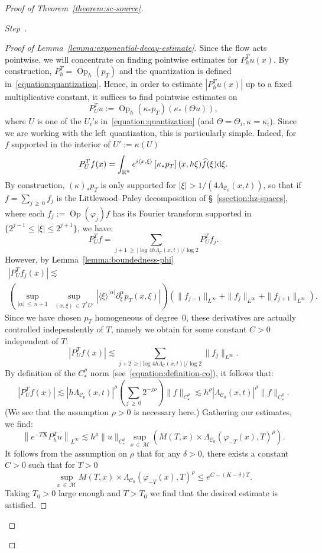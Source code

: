 \documentclass[AHL,Unicode,longabstracts,published]{cedram}
\newcommand{\R}{\mathbb{R}}
\newcommand{\X}{\mathbf{X}}
\newcommand{\M}{\mathcal{M}}
\newcommand{\clC}{\mathcal{C}}
\newcommand{\dd}{\mathrm{d}}
\DeclareMathOperator{\Op}{Op}
\newcounter{stepcount}
\newenvironment{step}{\refstepcounter{stepcount}\begin{proof}[Step~\thestepcount]}{\let\qed\relax\end{proof}}
\let\oldhat\hat
\renewcommand*{\hat}[1]{\mathchoice{\widehat{#1}}{\widehat{#1}}{\oldhat{#1}}{\oldhat{#1}}}
\begin{document}
\begin{proof}[Proof of Theorem~\ref{theorem:sc-source}]
\begin{step}
\begin{proof}[Proof of Lemma~\ref{lemma:exponential-decay-estimate}]
Since the flow acts pointwise, we will concentrate on finding pointwise estimates for $P^T_h u (x)$. By construction, $P^T_h = \Op_h(p_T)$ and the quantization is defined in~\eqref{equation:quantization}. Hence, in order to estimate $|P^T_h u(x)|$ up to a fixed multiplicative constant, it suffices to find pointwise estimates on
\[
P_U^T u := \Op_h(\kappa_* p_T) \left(\kappa_*(\Theta u)\right),
\]
where $U$ is one of the $U_i$'s in~\eqref{equation:quantization} (and $\Theta = \Theta_i, \kappa=\kappa_i$). Since we are working with the left quantization, this is particularly simple. Indeed, for $f$ supported in the interior of $U' := \kappa(U)$
\[
P_U^T f(x) = \int_{\R^n} e^{i \langle x, \xi\rangle} \left[\kappa_\ast p_T \right](x,h\xi)\hat{ f }(\xi) \dd \xi.
\]
By construction, $(\kappa)_\ast p_T$ is only supported for $|\xi| > 1/(4\Lambda_{\clC_0}(x,t))$, so that if $f = \sum_{j\,\geq\,0} f_j$ is the Littlewood--Paley decomposition of \S~\ref{ssection:hz-spaces}, where each $f_j := \Op(\varphi_j)f$ has its Fourier transform supported in $\{2^{j-1} \leq |\xi| \leq 2^{j+1}\}$, we have:
\[
P_U^T f = \sum_{j + 1\,\geq\,\left|\log 4 h \Lambda_{\clC}(x,t)\right| / \log 2 } P^T_U f_j.
\]
However, by Lemma~\ref{lemma:boundedness-phi}
\begin{multline*}
\left| P_U^T f_j(x)\right| \lesssim \\
\left(\sup_{|\alpha|\,\leq\,n+1 }\; \sup_{(x,\xi)\,\in\,T^*U'}\left| \langle\xi\rangle^{|\alpha|}\partial_\xi^\alpha p_T(x, \xi)\right|\right) \left(\| f_{j-1} \|_{L^\infty} + \| f_j \|_{L^\infty} + \| f_{j+1} \|_{L^\infty}\right).
\end{multline*}
Since we have chosen $p_T$ homogeneous of degree~$0$, these derivatives are actually controlled independently of $T$, namely we obtain for some constant $C >0$ independent of $T$:
\[
\left|P_U^T f(x)\right| \lesssim \sum_{j + 2\,\geq\left|\log 4 h \Lambda_{\clC}(x,t)\right| / \log 2 } \|f_j\|_{L^\infty}.
\]
By definition of the $C^\rho_\ast$ norm (see~\eqref{equation:definition-co}), it follows that:
\[
\left|P_U^T f(x)\right| \lesssim \left| h \Lambda_{\clC_0}(x,t) \right|^{\rho} \left(\sum_{j\,\geq\,0} 2^{-j\rho}\right) \|f\|_{C^\rho_\ast} \lesssim h^\rho |\Lambda_{\clC_0}(x,t)|^{\rho} \|f\|_{C^\rho_\ast}.
\]
(We see that the assumption $\rho>0$ is necessary here.) Gathering our estimates, we find:
\[
\left\| e^{-T \X} P^T_h u \right\|_{L^\infty} \lesssim h^\rho \| u \|_{C^\rho_\ast} \sup_{x \,\in\,\M} \left(M(T,x) \times \Lambda_{\clC_0}(\varphi_{-T}(x),T)^\rho \right).
\]
It follows from the assumption on $\rho$ that for any $\delta>0$, there exists a constant $C>0$ such that for $T>0$
\[
\sup_{x\,\in\,\M} M(T,x) \times \Lambda_{\clC_0}(\varphi_{-T}(x),T)^\rho \leq e^{C-(K-\delta) T}.
\]
Taking $T_0>0$ large enough and $T>T_0$ we find that the desired estimate is satisfied.
\end{proof}
\end{step}



\end{proof}
\end{document}
